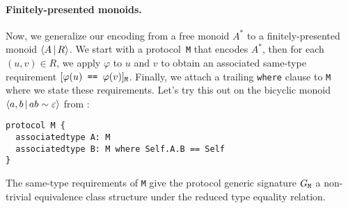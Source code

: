 \documentclass[../generics]{subfiles}
\begin{document}
\paragraph{Finitely-presented monoids.}
Now, we generalize our encoding from a free monoid $A^*$ to a finitely-presented monoid $\langle A\,|\,R\rangle$. We start with a protocol~\texttt{M} that encodes $A^*$, then for each $(u,v)\in R$, we apply $\varphi$ to $u$ and $v$ to obtain an associated same-type requirement $[\texttt{$\varphi(u)$ == $\varphi(v)$}]_{\texttt{M}}$. Finally, we attach a trailing \texttt{where} clause to \texttt{M} where we state these requirements. Let's try this out on the bicyclic monoid $\langle a, b\,|\,ab\sim\varepsilon\rangle$ from :
\begin{Verbatim}
protocol M {
  associatedtype A: M
  associatedtype B: M where Self.A.B == Self
}
\end{Verbatim}

\newcommand{\SameReqPhi}[2]{\SameReq{$\varphi(#1)$}{$\varphi(#2)$}}
\newcommand{\ConfReqPhi}[1]{\ConfReq{$\varphi(#1)$}{M}}

The same-type requirements of \texttt{M} give the protocol generic signature $G_\texttt{M}$ a non-trivial equivalence class structure under the reduced type equality relation. 
\end{document}
